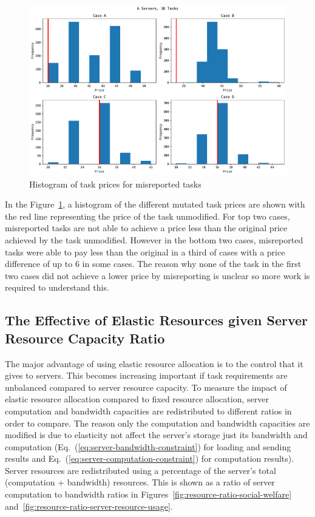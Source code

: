 \begin{figure}
    \centering
    \includegraphics[width=\linewidth]{figs/mutation/grid search.pdf}
    \caption{Histogram of task prices for misreported tasks}
    \label{fig:mutation-grid-search}
\end{figure}

In the Figure~\ref{fig:mutation-grid-search}, a histogram of the different mutated task prices are shown with the red line
representing the price of the task unmodified. For top two cases, misreported tasks are not able to achieve a price
less than the original price achieved by the task unmodified. However in the bottom two cases, misreported tasks were able
to pay less than the original in a third of cases with a price difference of up to 6 in some cases. The reason why none of
the task in the first two cases did not achieve a lower price by misreporting is unclear so more work is required to
understand this.

\subsection{The Effective of Elastic Resources given Server Resource Capacity Ratio}
\label{subsec:the-effective-of-elastic-resources-given-server-resource-capacity-ratio}
The major advantage of using elastic resource allocation is to the control that it gives to servers. This becomes
increasing important if task requirements are unbalanced compared to server resource capacity. To measure the impact
of elastic resource allocation compared to fixed resource allocation, server computation and bandwidth capacities
are redistributed to different ratios in order to compare. The reason only the computation and bandwidth capacities
are modified is due to elasticity not affect the server's storage just its bandwidth and computation
(Eq.~(\ref{eq:server-bandwidth-constraint}) for loading and sending results and Eq.~(\ref{eq:server-computation-constraint})
for computation results). \\
Server resources are redistributed using a percentage of the server's total (computation + bandwidth) resources.
This is shown as a ratio of server computation to bandwidth ratios in Figures~\ref{fig:resource-ratio-social-welfare}
and~\ref{fig:resource-ratio-server-resource-usage}.

